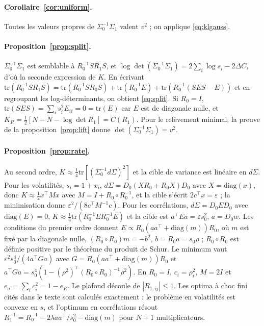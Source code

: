 \documentclass[12pt]{article}
\theoremstyle{definition}
\begin{document}
\begin{doublespace}
\paragraph{Corollaire~\ref{cor:uniform}.} Toutes les valeurs propres de
$\Sigma_0^{-1}\Sigma_1$ valent $v^2$ ; on applique \eqref{eq:klgauss}.

\paragraph{Proposition~\ref{prop:split}.} $\Sigma_0^{-1}\Sigma_1$ est semblable
à $R_0^{-1}SR_1S$, et $\log\det(\Sigma_0^{-1}\Sigma_1)=2\sum_i\log s_i
-2\Delta C$, d'où la seconde expression de $K$. En écrivant
$\mathrm{tr}(R_0^{-1}SR_1S)=\mathrm{tr}(R_0^{-1}SR_0S)+\mathrm{tr}(R_0^{-1}E)
+\mathrm{tr}(R_0^{-1}(SES-E))$ et en regroupant les log-déterminants, on
obtient \eqref{eq:split}. Si $R_0=I$, $\mathrm{tr}(SES)=\sum_is_i^2E_{ii}=0=
\mathrm{tr}(E)$ car $E$ est de diagonale nulle, et $K_R=\tfrac12[N-N-
\log\det R_1]=C(R_1)$. Pour le relèvement minimal, la preuve de la
proposition~\ref{prop:lift} donne $\det(\Sigma_0^{-1}\Sigma_1)=v^2$.

\paragraph{Proposition~\ref{prop:rate}.} Au second ordre,
$K\approx\tfrac14\mathrm{tr}[(\Sigma_0^{-1}d\Sigma)^2]$ et la cible de variance
est linéaire en $d\Sigma$. Pour les volatilités, $s_i=1+x_i$,
$d\Sigma=D_0(XR_0+R_0X)D_0$ avec $X=\mathrm{diag}(x)$, donc
$K\approx\tfrac12x^\top Mx$ avec $M=I+R_0\circ R_0^{-1}$, et la cible s'écrit
$2c^\top x=\varepsilon$ ; la minimisation donne $\varepsilon^2/(8c^\top
M^{-1}c)$. Pour les corrélations, $d\Sigma=D_0ED_0$ avec $\mathrm{diag}(E)=0$,
$K\approx\tfrac14\mathrm{tr}(R_0^{-1}ER_0^{-1}E)$ et la cible est
$a^\top Ea=\varepsilon s_0^2$, $a=D_0w$. Les conditions du premier ordre donnent
$E\propto R_0(aa^\top+\mathrm{diag}(m))R_0$, où $m$ est fixé par la diagonale
nulle, $(R_0\circ R_0)m=-b^2$, $b=R_0a=s_0\rho$ ; $R_0\circ R_0$ est définie
positive par le théorème du produit de Schur. Le minimum vaut
$\varepsilon^2s_0^4/(4a^\top Ga)$ avec $G=R_0(aa^\top+\mathrm{diag}(m))R_0$ et
$a^\top Ga=s_0^4(1-(\rho^2)^\top(R_0\circ R_0)^{-1}\rho^2)$. En $R_0=I$,
$c_i=\rho_i^2$, $M=2I$ et $e_\sigma=\sum_ic_i^2=1-e_R$. Le plafond découle de
$|R_{1,ij}|\le1$. Les optima à choc fini cités dans le texte sont calculés
exactement : le problème en volatilités est convexe en $s$, et l'optimum en
corrélations résout $R_1^{-1}=R_0^{-1}-2\lambda aa^\top/s_0^2-\mathrm{diag}(m)$
pour $N+1$ multiplicateurs.


\end{doublespace}
\end{document}
